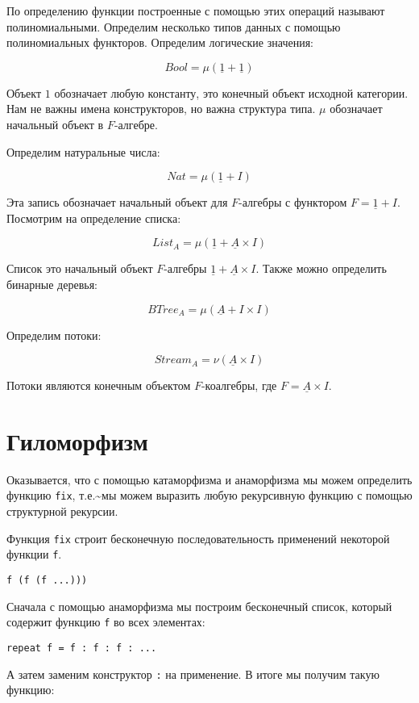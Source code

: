 По определению функции построенные с помощью этих операций называют
полиномиальными. Определим несколько типов данных с помощью
полиномиальных функторов. Определим логические значения:

\[Bool = \mu(\underline{1} + \underline{1})\]

Объект $1$ обозначает любую константу, это конечный объект исходной
категории. Нам не важны имена конструкторов, но важна структура типа.
$\mu$ обозначает начальный объект в $F$-алгебре.

Определим натуральные числа:

\[Nat = \mu(\underline{1} + I)\]

Эта запись обозначает начальный объект для $F$-алгебры с функтором
$F=\underline{1}+I$. Посмотрим на определение списка:

\[List_A = \mu(\underline{1} + \underline{A} \times I)\]

Список это начальный объект $F$-алгебры
$\underline{1}+\underline{A}\times I$. Также можно определить бинарные
деревья:

\[BTree_A = \mu(\underline{A} + I \times I )\]

Определим потоки:

\[Stream_A = \nu (\underline{A} \times I)\]

Потоки являются конечным объектом $F$-коалгебры, где
$F= \underline{A} \times I$.

\section{Гиломорфизм}

Оказывается, что с помощью катаморфизма и анаморфизма мы можем
определить функцию \texttt{fix}, т.е.\textasciitilde{}мы можем выразить
любую рекурсивную функцию с помощью структурной рекурсии.

Функция \texttt{fix} строит бесконечную последовательность применений
некоторой функции \texttt{f}.

\begin{verbatim}
f (f (f ...)))
\end{verbatim}

Сначала с помощью анаморфизма мы построим бесконечный список, который
содержит функцию \texttt{f} во всех элементах:

\begin{verbatim}
repeat f = f : f : f : ...
\end{verbatim}

А затем заменим конструктор \texttt{:} на применение. В итоге мы получим
такую функцию:

